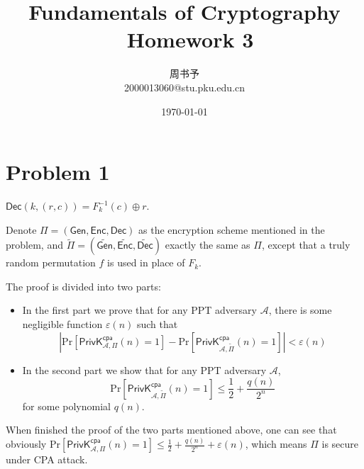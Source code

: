 \documentclass[8pt]{article}
\title{\heiti\zihao{1} Fundamentals  of Cryptography \ Homework 3}
\author{\kaishu\zihao{-3} 周书予\\2000013060@stu.pku.edu.cn}
\date{\today}
\theoremstyle{compact}
\def\le{\leqslant}
\begin{document}
\large
{}
\pagestyle{plain}



\maketitle

\def\PrivK#1#2{\textsf{PrivK}_{{#1}}^{\textsf{#2}}}

\section*{Problem 1}

$\textsf{Dec}(k, (r, c)) = F_k^{-1}(c) \oplus r$.

Denote $\Pi = (\textsf{Gen}, \textsf{Enc}, \textsf{Dec})$ as the encryption scheme mentioned in the problem, and $\tilde{\Pi} = (\widetilde{\textsf{Gen}}, \widetilde{\textsf{Enc}}, \widetilde{\textsf{Dec}})$ exactly the same as $\Pi$, except that a truly random permutation $f$ is used in place of $F_k$.

The proof is divided into two parts: \begin{itemize}
	\item In the first part we prove that for any PPT adversary $\mathcal A$, there is some negligible function $\varepsilon(n)$ such that \begin{equation}\left| \text{Pr}\left[\PrivK{\mathcal A, \Pi}{cpa}(n) = 1\right] - \text{Pr}\left[\PrivK{\mathcal A, \tilde{\Pi}}{cpa}(n) = 1\right] \right| < \varepsilon(n)\label{1-1}\end{equation}
	\item In the second part we show that for any PPT adversary $\mathcal A$, \begin{equation}\text{Pr}\left[\PrivK{\mathcal A, \tilde{\Pi}}{cpa}(n) = 1\right] \le \frac12 + \frac{q(n)}{2^n}\label{1-2}\end{equation} for some polynomial $q(n)$.
\end{itemize}

When finished the proof of the two parts mentioned above, one can see that obviously $\text{Pr}\left[\PrivK{\mathcal A, \Pi}{cpa}(n) = 1\right] \le \frac12 + \frac{q(n)}{2^n} + \varepsilon(n)$, which means $\Pi$ is secure under CPA attack.
\end{document}
